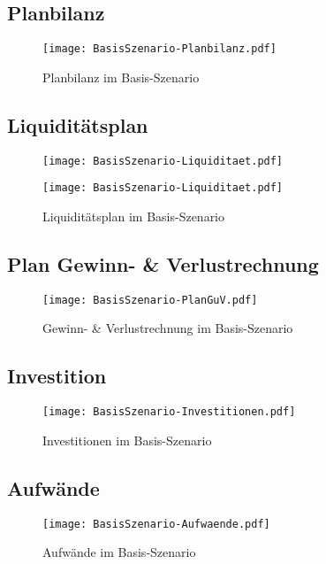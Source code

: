 \subsection{Planbilanz}
\begin{figure}[h]
	\centering
	\texttt{[image: BasisSzenario-Planbilanz.pdf]}
	\caption{Planbilanz im Basis-Szenario}
	\label{fig:BasisSzenario-Planbilanz}
\end{figure}

\newpage
\subsection{Liquiditätsplan}
\label{sec:BasisSzenario-Liquidität}
\begin{figure}[htp!]
	\centering
	\texttt{[image: BasisSzenario-Liquiditaet.pdf]}
	\label{fig:BasisSzenario-Liquiditaet-1}
\end{figure}
\begin{figure}[htp!]
	\centering
	\texttt{[image: BasisSzenario-Liquiditaet.pdf]}
	\caption{Liquiditätsplan im Basis-Szenario}
	\label{fig:BasisSzenario-Liquiditaet-2}
\end{figure}

\newpage
\subsection{Plan Gewinn- \& Verlustrechnung}
\begin{figure}[htp!]
	\centering
	\texttt{[image: BasisSzenario-PlanGuV.pdf]}
	\caption{Gewinn- \& Verlustrechnung im Basis-Szenario}
	\label{fig:BasisSzenario-GuV}
\end{figure}

\newpage
\subsection{Investition}
\begin{figure}[htp!]
	\centering
	\texttt{[image: BasisSzenario-Investitionen.pdf]}
	\caption{Investitionen im Basis-Szenario}
	\label{fig:BasisSzenario-Investitionen}
\end{figure}

\begin{landscape}
	\subsection{Aufwände}
	\begin{figure}[htp!]
		\centering
		\texttt{[image: BasisSzenario-Aufwaende.pdf]}
		\caption{Aufwände im Basis-Szenario}
		\label{fig:BasisSzenario-Aufwaende}
	\end{figure}
\end{landscape}

